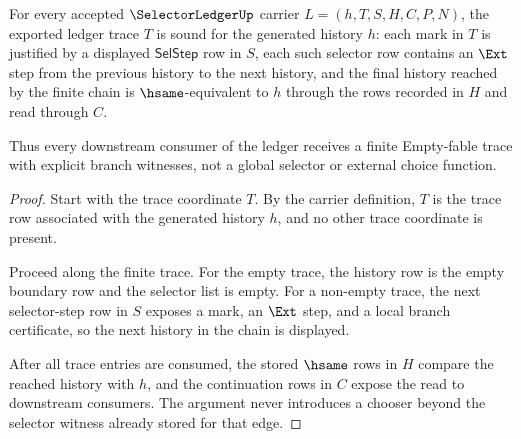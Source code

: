 \begin{theorem}
\label{thm:selector-ledger-trace-soundness}
For every accepted $\SelectorLedgerUp$ carrier $L=(h,T,S,H,C,P,N)$, the exported ledger trace $T$ is sound for the generated history $h$: each mark in $T$ is justified by a displayed $\mathsf{SelStep}$ row in $S$, each such selector row contains an $\Ext$ step from the previous history to the next history, and the final history reached by the finite chain is $\hsame$-equivalent to $h$ through the rows recorded in $H$ and read through $C$.

Thus every downstream consumer of the ledger receives a finite Empty-fable trace with explicit branch witnesses, not a global selector or external choice function.
\end{theorem}
\begin{proof}
Start with the trace coordinate $T$. By the carrier definition, $T$ is the trace row associated with the generated history $h$, and no other trace coordinate is present.

Proceed along the finite trace. For the empty trace, the history row is the empty boundary row and the selector list is empty. For a non-empty trace, the next selector-step row in $S$ exposes a mark, an $\Ext$ step, and a local branch certificate, so the next history in the chain is displayed.

After all trace entries are consumed, the stored $\hsame$ rows in $H$ compare the reached history with $h$, and the continuation rows in $C$ expose the read to downstream consumers. The argument never introduces a chooser beyond the selector witness already stored for that edge.
\end{proof}


